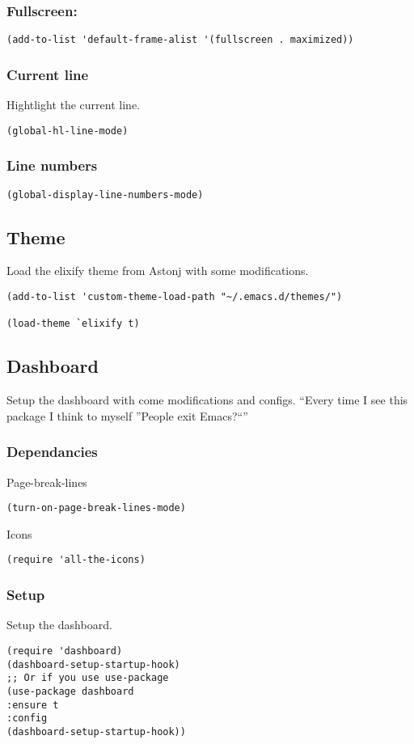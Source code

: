 \documentclass[11pt]{article}
\begin{document}
\subsubsection*{Fullscreen:}
\label{sec:org589ede9}
\begin{verbatim}
(add-to-list 'default-frame-alist '(fullscreen . maximized))
\end{verbatim}
\subsubsection*{Current line}
\label{sec:org974b3e4}
Hightlight the current line.
\begin{verbatim}
(global-hl-line-mode)
\end{verbatim}
\subsubsection*{Line numbers}
\label{sec:org646568c}
\begin{verbatim}
(global-display-line-numbers-mode)
\end{verbatim}
\subsection*{Theme}
\label{sec:org3016e83}
Load the elixify theme from Astonj with some modifications.
\begin{verbatim}
(add-to-list 'custom-theme-load-path "~/.emacs.d/themes/")

(load-theme `elixify t)
\end{verbatim}
\subsection*{Dashboard}
\label{sec:orgc195a66}
Setup the dashboard with come modifications and configs.
``Every time I see this package I think to myself ''People exit Emacs?``''
\subsubsection*{Dependancies}
\label{sec:org8ddd19c}
Page-break-lines
\begin{verbatim}
(turn-on-page-break-lines-mode)
\end{verbatim}
Icons
\begin{verbatim}
(require 'all-the-icons)
\end{verbatim}
\subsubsection*{Setup}
\label{sec:org8e81352}
Setup the dashboard.
\begin{verbatim}
(require 'dashboard)
(dashboard-setup-startup-hook)
;; Or if you use use-package
(use-package dashboard
:ensure t
:config
(dashboard-setup-startup-hook))
\end{verbatim}
\end{document}
